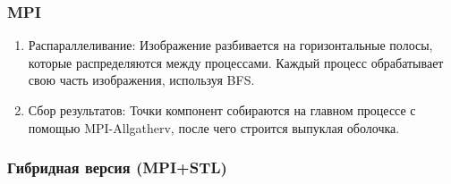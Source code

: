 \documentclass[12pt]{article}
\begin{document}
\subsubsection{MPI}
\begin{enumerate}
    \item Распараллеливание: Изображение разбивается на горизонтальные полосы, которые распределяются между процессами. Каждый процесс обрабатывает свою часть изображения, используя BFS.
    \item Сбор результатов: Точки компонент собираются на главном процессе с помощью MPI-Allgatherv, после чего строится выпуклая оболочка.
\end{enumerate}

\subsubsection{Гибридная версия (MPI+STL)}
\end{document}
